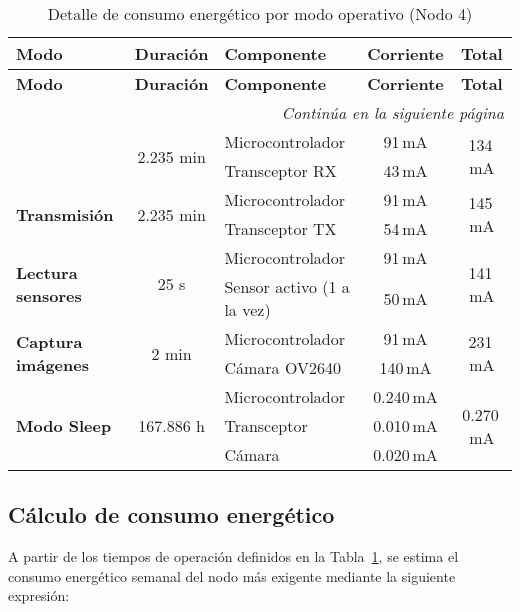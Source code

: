 \begin{longtable}{l c l c c}
\caption{Detalle de consumo energético por modo operativo (Nodo 4)} \label{tab:consumo_operativo} \\
\toprule
\textbf{Modo} & \textbf{Duración} & \textbf{Componente} & \textbf{Corriente} & \textbf{Total} \\
\midrule
\endfirsthead

\toprule
\textbf{Modo} & \textbf{Duración} & \textbf{Componente} & \textbf{Corriente} & \textbf{Total} \\
\midrule
\endhead

\hline
\multicolumn{5}{r}{\textit{Continúa en la siguiente página}} \\
\endfoot

\hline
\endlastfoot

\multirow{2}{*}{\textbf{Recepción}} & \multirow{2}{*}{2.235 min} & Microcontrolador & 91\,mA & \multirow{2}{*}{134\,mA} \\
& & Transceptor RX & 43\,mA & \\
\cmidrule(lr){1-5}

\multirow{2}{*}{\textbf{Transmisión}} & \multirow{2}{*}{2.235 min} & Microcontrolador & 91\,mA & \multirow{2}{*}{145\,mA} \\
& & Transceptor TX & 54\,mA & \\
\cmidrule(lr){1-5}

\multirow{2}{*}{\textbf{Lectura sensores}} & \multirow{2}{*}{25 s} & Microcontrolador & 91\,mA & \multirow{2}{*}{141\,mA} \\
& & Sensor activo (1 a la vez) & 50\,mA & \\
\cmidrule(lr){1-5}

\multirow{2}{*}{\textbf{Captura imágenes}} & \multirow{2}{*}{2 min} & Microcontrolador & 91\,mA & \multirow{2}{*}{231\,mA} \\
& & Cámara OV2640 & 140\,mA & \\
\cmidrule(lr){1-5}

\multirow{3}{*}{\textbf{Modo Sleep}} & \multirow{3}{*}{167.886 h} & Microcontrolador & 0.240\,mA & \multirow{3}{*}{0.270\,mA} \\
& & Transceptor & 0.010\,mA & \\
& & Cámara & 0.020\,mA & \\

\end{longtable}

\subsection{Cálculo de consumo energético}
A partir de los tiempos de operación definidos en la Tabla~\ref{tab:consumo_operativo}, se estima el consumo energético semanal del nodo más exigente mediante la siguiente expresión:

